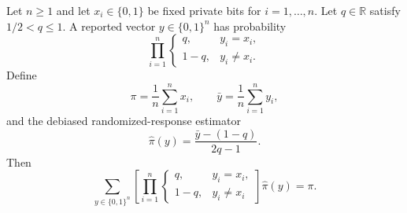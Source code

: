 \begin{theorem}
Let $n\ge 1$ and let $x_i\in\{0,1\}$ be fixed private bits for
$i=1,\ldots,n$. Let $q\in\mathbb R$ satisfy $1/2<q\le 1$. A reported vector
$y\in\{0,1\}^n$ has probability
\[
\prod_{i=1}^n
\begin{cases}
q, & y_i=x_i,\\
1-q, & y_i\ne x_i .
\end{cases}
\]
Define
\[
\pi=\frac1n\sum_{i=1}^n x_i,\qquad
\bar y=\frac1n\sum_{i=1}^n y_i,
\]
and the debiased randomized-response estimator
\[
\widehat\pi(y)=\frac{\bar y-(1-q)}{2q-1}.
\]
Then
\[
\sum_{y\in\{0,1\}^n}
\left[
\prod_{i=1}^n
\begin{cases}
q, & y_i=x_i,\\
1-q, & y_i\ne x_i
\end{cases}
\right]\widehat\pi(y)
=\pi .
\]
\end{theorem}
